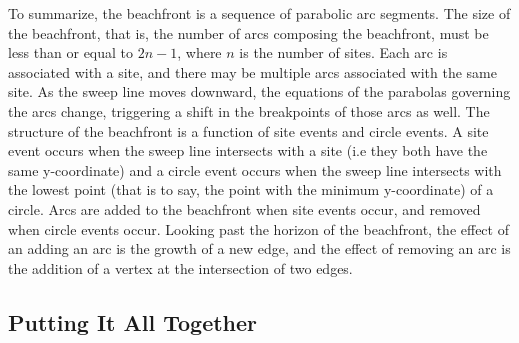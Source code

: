 \documentclass[12pt,twoside]{reedthesis}
\begin{document}
        To summarize, the beachfront is a sequence of parabolic arc segments. The size of the beachfront, that is, the number of arcs composing the beachfront, must be less than or equal to $2n-1$, where $n$ is the number of sites. Each arc is associated with a site, and there may be multiple arcs associated with the same site. As the sweep line moves downward, the equations of the parabolas governing the arcs change, triggering a shift in the breakpoints of those arcs as well. The structure of the beachfront is a function of site events and circle events. A site event occurs when the sweep line intersects with a site (i.e they both have the same y-coordinate) and a circle event occurs when the sweep line intersects with the lowest point (that is to say, the point with the minimum y-coordinate) of a circle. Arcs are added to the beachfront when site events occur, and removed when circle events occur. Looking past the horizon of the beachfront, the effect of an adding an arc is the growth of a new edge, and the effect of removing an arc is the addition of a vertex at the intersection of two edges.\par



    \subsection{Putting It All Together} %
    \label{sub:putting_it_all_together}
\end{document}
